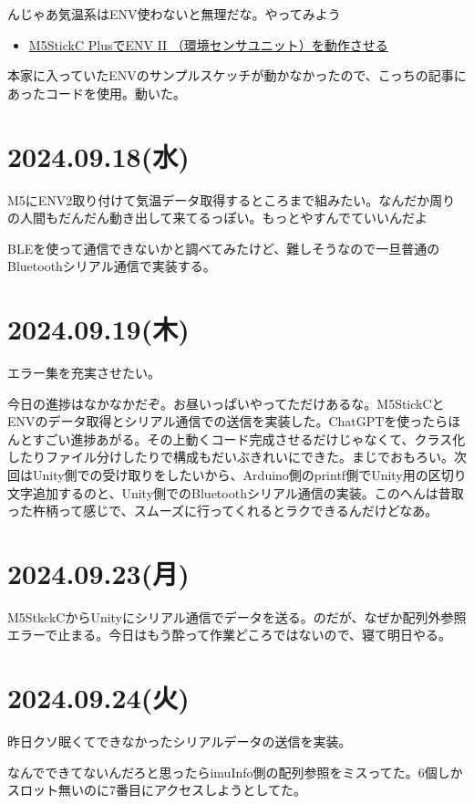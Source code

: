\documentclass[fleqn,twocolumn]{mynote}
\begin{document}
  んじゃあ気温系はENV使わないと無理だな。やってみよう

  \begin{itemize}
    \item
      \href{https://qiita.com/visyeii/items/e28f8500f43166710664}{M5StickC
      PlusでENV II （環境センサユニット）を動作させる}
  \end{itemize}

  本家に入っていたENVのサンプルスケッチが動かなかったので、こっちの記事にあったコードを使用。動いた。

  \section*{2024.09.18(水)}
  M5にENV2取り付けて気温データ取得するところまで組みたい。なんだか周りの人間もだんだん動き出して来てるっぽい。もっとやすんでていいんだよ

  BLEを使って通信できないかと調べてみたけど、難しそうなので一旦普通のBluetoothシリアル通信で実装する。

  \section*{2024.09.19(木)}
  エラー集を充実させたい。

  今日の進捗はなかなかだぞ。お昼いっぱいやってただけあるな。M5StickCとENVのデータ取得とシリアル通信での送信を実装した。ChatGPTを使ったらほんとすごい進捗あがる。その上動くコード完成させるだけじゃなくて、クラス化したりファイル分けしたりで構成もだいぶきれいにできた。まじでおもろい。次回はUnity側での受け取りをしたいから、Arduino側のprintf側でUnity用の区切り文字追加するのと、Unity側でのBluetoothシリアル通信の実装。このへんは昔取った杵柄って感じで、スムーズに行ってくれるとラクできるんだけどなあ。

  \section*{2024.09.23(月)}
  M5StkckCからUnityにシリアル通信でデータを送る。のだが、なぜか配列外参照エラーで止まる。今日はもう酔って作業どころではないので、寝て明日やる。

  \section*{2024.09.24(火)}
  昨日クソ眠くてできなかったシリアルデータの送信を実装。

  なんでできてないんだろと思ったらimuInfo側の配列参照をミスってた。6個しかスロット無いのに7番目にアクセスしようとしてた。
\end{document}
